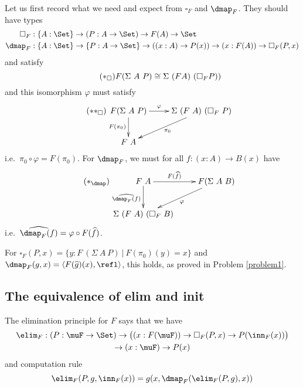 \documentclass{article}
\begin{document}
Let us first record what we need and expect from $\square_F$ and $\dmap_F$. They should have types
\begin{align*}
\square_F &: \{A : \Set\} \to (P : A \to \Set) \to F(A) \to \Set \\
\dmap_F &: \{A : \Set\} \to \{P : A \to \Set\} \to ((x : A) \to  P(x)) \to (x : F(A)) \to \square_F(P, x)
\end{align*}
and satisfy
\begin{equation}
  \label{eq:square}
  \tag{$\ast_{\square}$}
F (\Sigma\ A\ P) \cong \Sigma\ (F A)\ (\square_F P))
\end{equation}
and this isomorphism $\varphi$ must satisfy
\begin{equation}
  \label{eq:square2}
  \tag{$\ast\ast_{\square}$}
\xymatrix
{
F(\Sigma\ A\ P) \ar^-{\varphi}[r] \ar_{F(\pi_0)}[d] & \Sigma\ (F\ A)\ (\square_F\ P) \ar^{\pi_0}[dl] \\
F\ A  & 
}
\end{equation}
i.e.\ $\pi_0 \circ \varphi = F(\pi_0)$. For $\dmap_F$, we must for all $f : (x : A) \to B(x)$ have
\begin{equation}
  \label{eq:dmap}
  \tag{$\ast_{\dmap}$}
\xymatrix{
F\ A \ar^-{F(\widehat{f})}[r] \ar_{\widehat{\dmap_F(f)}}[d]& F(\Sigma\ A\ B) \ar^{\varphi}[dl] \\
\Sigma\ (F\ A)\ (\square_F\ B) & 
}
\end{equation}
i.e.\ $\widehat{\dmap_F(f)} = \varphi \circ F(\widehat{f})$.

For $\square_F(P, x) = \{ y : F\ (\Sigma\ A\ P )\ |\ F(\pi_0)(y) =
x\}$ and $\dmap_F(g, x) = \langle F(\widehat{g})(x), \refl\rangle$,
this holds, as proved in Problem \ref{problem1}.

\subsection*{The equivalence of elim and init}

\begin{principle}[Elim]
  The elimination principle for $F$ says that we have
\begin{multline*}
  \elim_F : (P : \muF \to \Set) \to \big( (x : F(\muF)) \to
  \square_F(P, x) \to P(\inn_F(x))\big) \\ \to (x : \muF) \to P(x)
\end{multline*}
and computation rule
\[
\elim_F(P, g, \inn_F(x)) = g(x, \dmap_F(\elim_F(P, g), x))
\]
\end{principle}
\end{document}
